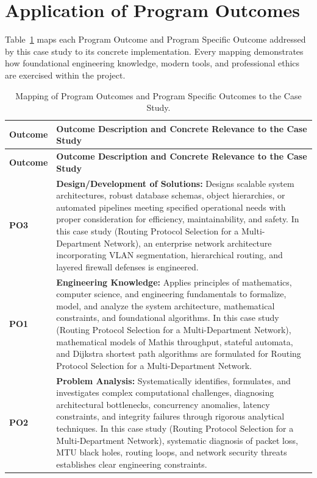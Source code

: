 \section{Application of Program Outcomes}
Table~\ref{tab:po} maps each Program Outcome and Program Specific Outcome addressed by this case study to its concrete implementation. Every mapping demonstrates how foundational engineering knowledge, modern tools, and professional ethics are exercised within the project.

{\small
\begin{longtable}{@{}>{\centering\arraybackslash}p{1.8cm} p{13.2cm}@{}}
    \caption{Mapping of Program Outcomes and Program Specific Outcomes to the Case Study.}\label{tab:po}\\
    \toprule
    \textbf{Outcome} & \textbf{Outcome Description and Concrete Relevance to the Case Study} \\
    \midrule
    \endfirsthead
    \toprule
    \textbf{Outcome} & \textbf{Outcome Description and Concrete Relevance to the Case Study} \\
    \midrule
    \endhead
\textbf{PO3} & \textbf{Design/Development of Solutions:} Designs scalable system architectures, robust database schemas, object hierarchies, or automated pipelines meeting specified operational needs with proper consideration for efficiency, maintainability, and safety. In this case study (Routing Protocol Selection for a Multi-Department Network), an enterprise network architecture incorporating VLAN segmentation, hierarchical routing, and layered firewall defenses is engineered. \\
    \addlinespace
\textbf{PO1} & \textbf{Engineering Knowledge:} Applies principles of mathematics, computer science, and engineering fundamentals to formalize, model, and analyze the system architecture, mathematical constraints, and foundational algorithms. In this case study (Routing Protocol Selection for a Multi-Department Network), mathematical models of Mathis throughput, stateful automata, and Dijkstra shortest path algorithms are formulated for Routing Protocol Selection for a Multi-Department Network. \\
    \addlinespace
\textbf{PO2} & \textbf{Problem Analysis:} Systematically identifies, formulates, and investigates complex computational challenges, diagnosing architectural bottlenecks, concurrency anomalies, latency constraints, and integrity failures through rigorous analytical techniques. In this case study (Routing Protocol Selection for a Multi-Department Network), systematic diagnosis of packet loss, MTU black holes, routing loops, and network security threats establishes clear engineering constraints. \\

\end{longtable}}
